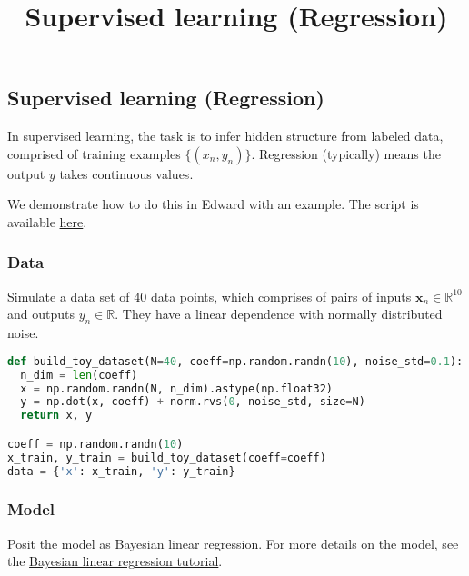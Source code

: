 \title{Supervised learning (Regression)}

\subsection{Supervised learning (Regression)}

In supervised learning, the task is to infer hidden structure from
labeled data, comprised of training examples $\{(x_n, y_n)\}$.
Regression (typically) means the output $y$ takes continuous values.

We demonstrate how to do this in Edward with an example.
The script is available
\href{https://github.com/blei-lab/edward/blob/master/examples/bayesian_linear_regression_test.py}
{here}.


\subsubsection{Data}

Simulate a data set of $40$ data points, which comprises of pairs of inputs $\mathbf{x}_n\in\mathbb{R}^{10}$ and outputs
$y_n\in\mathbb{R}$. They have a linear dependence with normally distributed noise.

\begin{lstlisting}[language=Python]
def build_toy_dataset(N=40, coeff=np.random.randn(10), noise_std=0.1):
  n_dim = len(coeff)
  x = np.random.randn(N, n_dim).astype(np.float32)
  y = np.dot(x, coeff) + norm.rvs(0, noise_std, size=N)
  return x, y

coeff = np.random.randn(10)
x_train, y_train = build_toy_dataset(coeff=coeff)
data = {'x': x_train, 'y': y_train}
\end{lstlisting}


\subsubsection{Model}

Posit the model as Bayesian linear regression. For more details on the
model, see the
\href{tut_bayesian_linear_regression.html}
{Bayesian linear regression tutorial}.

